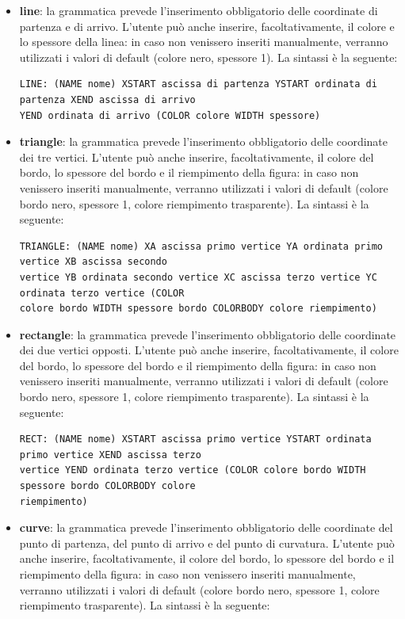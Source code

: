 \documentclass[a4paper]{article}
\begin{document}
\begin{itemize}
\item \textbf{line}: la grammatica prevede l'inserimento obbligatorio delle coordinate di partenza e di arrivo. L’utente può anche inserire, facoltativamente, il colore e lo spessore della linea: in caso non venissero inseriti manualmente, verranno utilizzati i valori di default (colore nero, spessore 1). La sintassi è la seguente:
\begin{verbatim}
LINE: (NAME nome) XSTART ascissa di partenza YSTART ordinata di partenza XEND ascissa di arrivo
YEND ordinata di arrivo (COLOR colore WIDTH spessore)
\end{verbatim}
\item \textbf{triangle}: la grammatica prevede l'inserimento obbligatorio delle coordinate dei tre vertici. L’utente può anche inserire, facoltativamente, il colore del bordo, lo spessore del bordo e il riempimento della figura: in caso non venissero inseriti manualmente, verranno utilizzati i valori di default (colore bordo nero, spessore 1, colore riempimento trasparente). La sintassi è la seguente:
\begin{verbatim}
TRIANGLE: (NAME nome) XA ascissa primo vertice YA ordinata primo vertice XB ascissa secondo
vertice YB ordinata secondo vertice XC ascissa terzo vertice YC ordinata terzo vertice (COLOR
colore bordo WIDTH spessore bordo COLORBODY colore riempimento)
\end{verbatim}
\item \textbf{rectangle}: la grammatica prevede l'inserimento obbligatorio delle coordinate dei due vertici opposti. L’utente può anche inserire, facoltativamente, il colore del bordo, lo spessore del bordo e il riempimento della figura: in caso non venissero inseriti manualmente, verranno utilizzati i valori di default (colore bordo nero, spessore 1, colore riempimento trasparente). La sintassi è la seguente:
\begin{verbatim}
RECT: (NAME nome) XSTART ascissa primo vertice YSTART ordinata primo vertice XEND ascissa terzo
vertice YEND ordinata terzo vertice (COLOR colore bordo WIDTH spessore bordo COLORBODY colore
riempimento)
\end{verbatim}
\item \textbf{curve}: la grammatica prevede l'inserimento obbligatorio delle coordinate del punto di partenza, del punto di arrivo e del punto di curvatura. L’utente può anche inserire, facoltativamente, il colore del bordo, lo spessore del bordo e il riempimento della figura: in caso non venissero inseriti manualmente, verranno utilizzati i valori di default (colore bordo nero, spessore 1, colore riempimento trasparente). La sintassi è la seguente:

\end{itemize}
\end{document}
